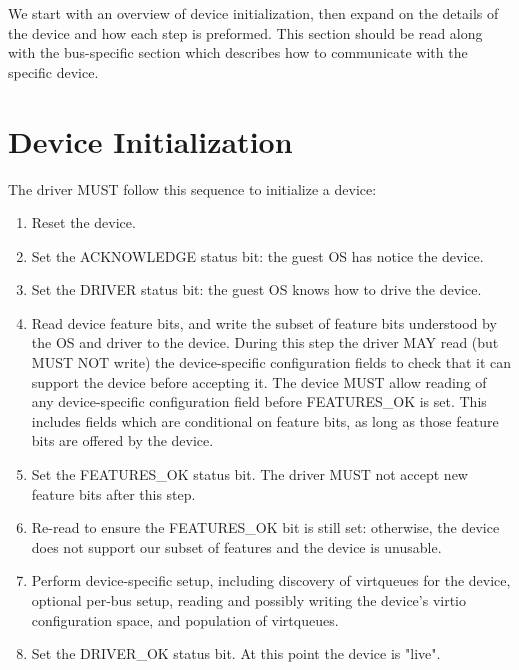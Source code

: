 We start with an overview of device initialization, then expand on the
details of the device and how each step is preformed.  This section
should be read along with the bus-specific section which describes
how to communicate with the specific device.

\section{Device Initialization}\label{sec:General Initialization And Device Operation / Device Initialization}

The driver MUST follow this sequence to initialize a device:

\begin{enumerate}
\item Reset the device.

\item Set the ACKNOWLEDGE status bit: the guest OS has notice the device.

\item Set the DRIVER status bit: the guest OS knows how to drive the device.

\item Read device feature bits, and write the subset of feature bits
   understood by the OS and driver to the device.  During this step the
   driver MAY read (but MUST NOT write) the device-specific configuration fields to check that it can support the device before accepting it.
   The device MUST allow reading of any device-specific configuration field
   before FEATURES_OK is set.  This includes fields which are conditional
   on feature bits, as long as those feature bits are offered by the device.

\item\label{itm:General Initialization And Device Operation / Device Initialization / Set FEATURES-OK} Set the FEATURES_OK status bit.  The driver MUST not accept
   new feature bits after this step.

\item\label{itm:General Initialization And Device Operation / Device Initialization / Re-read FEATURES-OK} Re-read  to ensure the FEATURES_OK bit is still
   set: otherwise, the device does not support our subset of features
   and the device is unusable.

\item\label{itm:General Initialization And Device Operation / Device Initialization / Device-specific Setup} Perform device-specific setup, including discovery of virtqueues for the
   device, optional per-bus setup, reading and possibly writing the
   device's virtio configuration space, and population of virtqueues.

\item\label{itm:General Initialization And Device Operation / Device Initialization / Set DRIVER-OK} Set the DRIVER_OK status bit.  At this point the device is
   "live".
\end{enumerate}

